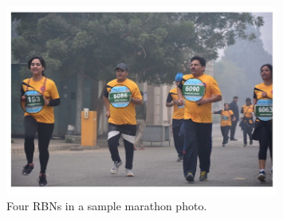 \begin{figure}[tbh!]
  \centering
  \includegraphics[width=0.8\textwidth]{images/introduction/rbn}
  \caption[Sample racing bib numbers]{Four RBNs in a sample marathon photo.}
  \label{fig:sample_rbns}
\end{figure}

